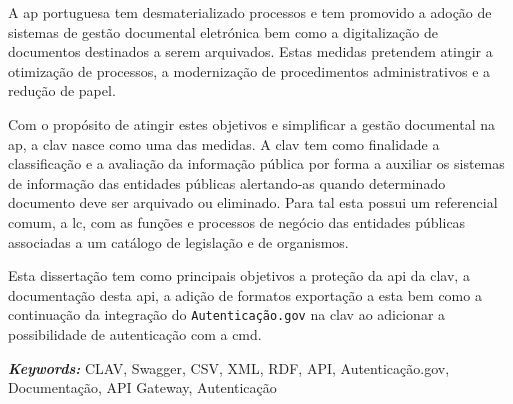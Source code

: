 A \acrlong{ap} portuguesa tem desmaterializado processos e tem promovido a adoção de sistemas de gestão documental eletrónica bem como a digitalização de documentos destinados a serem arquivados. Estas medidas pretendem atingir a otimização de processos, a modernização de procedimentos administrativos e a redução de papel.

Com o propósito de atingir estes objetivos e simplificar a gestão documental na \acrlong{ap}, a \acrfull{clav} nasce como uma das medidas. A \acrshort{clav} tem como finalidade a classificação e a avaliação da informação pública por forma a auxiliar os sistemas de informação das entidades públicas alertando-as quando determinado documento deve ser arquivado ou eliminado. Para tal esta possui um referencial comum, a \acrlong{lc}, com as funções e processos de negócio das entidades públicas associadas a um catálogo de legislação e de organismos.

Esta dissertação tem como principais objetivos a proteção da \acrshort{api} da \acrshort{clav}, a documentação desta \acrshort{api}, a adição de formatos exportação a esta bem como a continuação da integração do \texttt{Autenticação.gov} na \acrshort{clav} ao adicionar a possibilidade de autenticação com a \acrlong{cmd}.

\vspace{1cm}

\textit{\textbf{Keywords:}} CLAV, Swagger, CSV, XML, RDF, API, Autenticação.gov, Documentação, API Gateway, Autenticação
